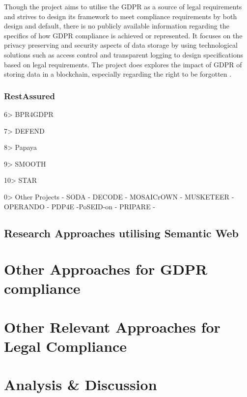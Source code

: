 Though the project aims to utilise the GDPR as a source of legal requirements and strives to design its framework to meet compliance requirements by both design and default, there is no publicly available information regarding the specifics of how GDPR compliance is achieved or represented.
It focuses on the privacy preserving and security aspects of data storage by using technological solutions such as access control and transparent logging to design specifications based on legal requirements.
The project does explores the impact of GDPR of storing data in a blockchain, especially regarding the right to be forgotten \cite{bayle_when_2018}.

\subsubsection{RestAssured}

6> BPR4GDPR

7> DEFEND

8> Papaya

9> SMOOTH

10> STAR

0> Other Projects
- SODA
- DECODE 
- MOSAICrOWN
- MUSKETEER
- OPERANDO
- PDP4E
-PoSEID-on
- PRIPARE
- 

\subsection{Research Approaches utilising Semantic Web}

\section{Other Approaches for GDPR compliance}\label{sec:sota:gdpr-other}

\section{Other Relevant Approaches for Legal Compliance}\label{sec:sota:other}

\section{Analysis \& Discussion}\label{sec:sota:analysis}